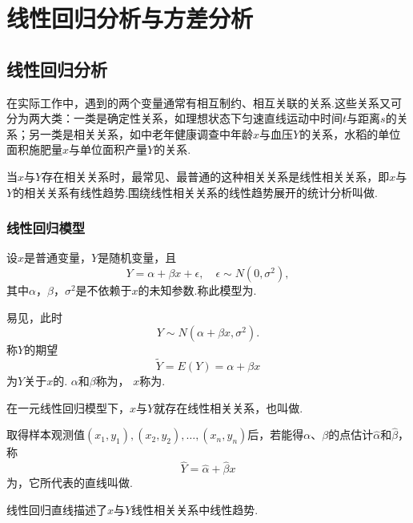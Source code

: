 \chapter{线性回归分析与方差分析}
\section{线性回归分析}
在实际工作中，遇到的两个变量通常有相互制约、相互关联的关系.这些关系又可分为两大类：一类是确定性关系，如理想状态下匀速直线运动中时间\(t\)与距离\(s\)的关系；另一类是相关关系，如中老年健康调查中年龄\(x\)与血压\(Y\)的关系，水稻的单位面积施肥量\(x\)与单位面积产量\(Y\)的关系.

当\(x\)与\(Y\)存在相关关系时，最常见、最普通的这种相关关系是线性相关关系，即\(x\)与\(Y\)的相关关系有线性趋势.围绕线性相关关系的线性趋势展开的统计分析叫做.

\subsection{线性回归模型}
\begin{definition}
设\(x\)是普通变量，\(Y\)是随机变量，且\begin{equation*}
Y = \alpha + \beta x + \epsilon,
\quad \epsilon \sim N(0,\sigma^2),
\end{equation*}其中\(\alpha\)，\(\beta\)，\(\sigma^2\)是不依赖于\(x\)的未知参数.称此模型为.

易见，此时\begin{equation*}
	Y \sim N(\alpha + \beta x,\sigma^2).
\end{equation*}
称\(Y\)的期望\begin{equation*}
	\tilde{Y} = E(Y) = \alpha + \beta x
\end{equation*}为\(Y\)关于\(x\)的.
\(\alpha\)和\(\beta\)称为，
\(x\)称为.

在一元线性回归模型下，\(x\)与\(Y\)就存在线性相关关系，也叫做.

取得样本观测值\((x_1,y_1),(x_2,y_2),\dotsc,(x_n,y_n)\)后，若能得\(\alpha\)、\(\beta\)的点估计\(\hat{\alpha}\)和\(\hat{\beta}\)，称\begin{equation*}
\hat{Y} = \hat{\alpha} + \hat{\beta} x
\end{equation*}为，它所代表的直线叫做.
\end{definition}
线性回归直线描述了\(x\)与\(Y\)线性相关关系中线性趋势.

